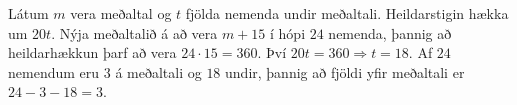 Látum $m$ vera meðaltal og $t$ fjölda nemenda undir meðaltali.
Heildarstigin hækka um $20t$. Nýja meðaltalið á að vera $m+15$
í hópi $24$ nemenda, þannig að heildarhækkun þarf að vera $24\cdot15=360$.
Því $20t=360 \Rightarrow t=18$.
Af $24$ nemendum eru $3$ á meðaltali og $18$ undir, þannig að
fjöldi yfir meðaltali er $24-3-18=3$.